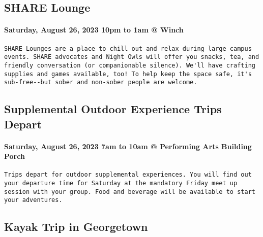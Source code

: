 \documentclass[
]{article}
\begin{document}
\hypertarget{share-lounge}{%
\subsection{SHARE Lounge}\label{share-lounge}}

\hypertarget{saturday-august-26-2023-10pm-to-1am-winch}{%
\paragraph{Saturday, August 26, 2023 10pm to 1am @
Winch}\label{saturday-august-26-2023-10pm-to-1am-winch}}

\begin{verbatim}
SHARE Lounges are a place to chill out and relax during large campus events. SHARE advocates and Night Owls will offer you snacks, tea, and friendly conversation (or companionable silence). We'll have crafting supplies and games available, too! To help keep the space safe, it's sub-free--but sober and non-sober people are welcome.
\end{verbatim}

\hypertarget{supplemental-outdoor-experience-trips-depart}{%
\subsection{Supplemental Outdoor Experience Trips
Depart}\label{supplemental-outdoor-experience-trips-depart}}

\hypertarget{saturday-august-26-2023-7am-to-10am-performing-arts-building-porch}{%
\paragraph{Saturday, August 26, 2023 7am to 10am @ Performing Arts
Building
Porch}\label{saturday-august-26-2023-7am-to-10am-performing-arts-building-porch}}

\begin{verbatim}
Trips depart for outdoor supplemental experiences. You will find out your departure time for Saturday at the mandatory Friday meet up session with your group. Food and beverage will be available to start your adventures.
\end{verbatim}

\hypertarget{kayak-trip-in-georgetown}{%
\subsection{Kayak Trip in Georgetown}\label{kayak-trip-in-georgetown}}
\end{document}
